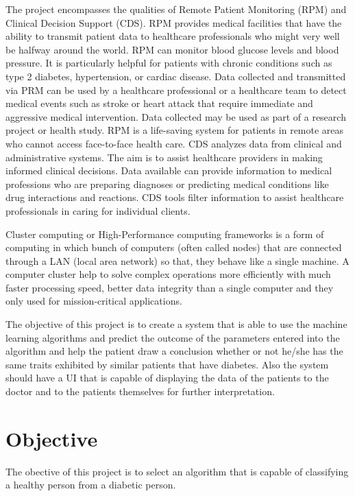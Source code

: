 \documentclass[12pt]{article}
\begin{document}
The project encompasses the qualities of Remote Patient Monitoring (RPM) and Clinical Decision Support (CDS). RPM provides medical facilities that have the ability to transmit patient data to healthcare professionals who might very well be halfway around the world. RPM can monitor blood glucose levels and blood pressure. It is particularly helpful for patients with chronic conditions such as type 2 diabetes, hypertension, or cardiac disease. Data collected and transmitted via PRM can be used by a healthcare professional or a healthcare team to detect medical events such as stroke or heart attack that require immediate and aggressive medical intervention. Data collected may be used as part of a research project or health study. RPM is a life-saving system for patients in remote areas who cannot access face-to-face health care. CDS analyzes data from clinical and administrative systems. The aim is to assist healthcare providers in making informed clinical decisions. Data available can provide information to medical professions who are preparing diagnoses or predicting medical conditions like drug interactions and reactions. CDS tools filter information to assist healthcare professionals in caring for individual clients. 

Cluster computing or High-Performance computing frameworks is a form of computing in which bunch of computers (often called nodes) that are connected through a LAN (local area network) so that, they behave like a single machine. A computer cluster help to solve complex operations more efficiently with much faster processing speed, better data integrity than a single computer and they only used for mission-critical applications.

The objective of this project is to create a  system that is able to use the machine learning algorithms and predict the outcome of the parameters entered into the algorithm and help the patient draw a conclusion whether or not he/she has the same traits exhibited by similar patients that have diabetes. Also the system should have a UI that is capable of displaying the data of the patients to the doctor and to the patients themselves for further interpretation.

\newpage
\section{Objective}
The obective of this project is to select an algorithm that is capable of classifying a healthy person from a diabetic person.
\end{document}
